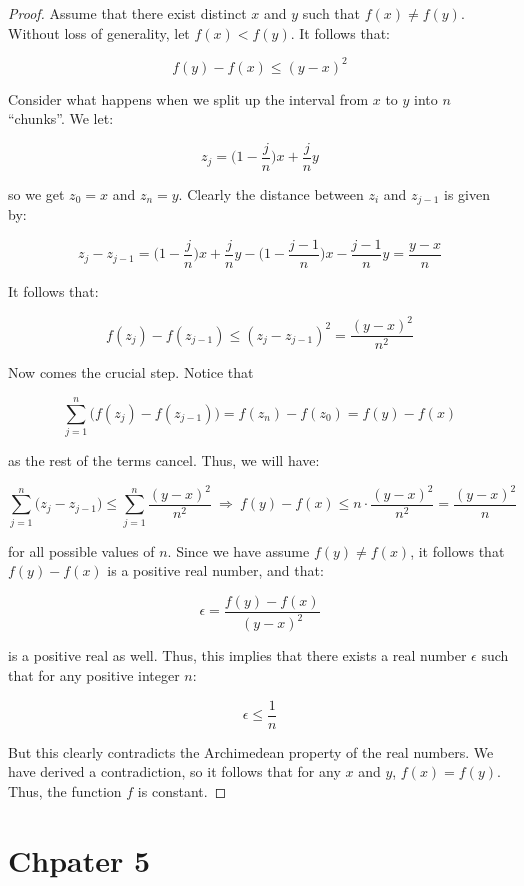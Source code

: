 \documentclass[10pt, oneside]{amsart}
\begin{document}
    \begin{proof}
      Assume that there exist distinct $x$ and $y$ such that $f(x) \neq f(y)$. Without loss of generality, let $f(x) < f(y)$. It follows that:

      $$f(y) - f(x) \leq (y - x)^2$$

      Consider what happens when we split up the interval from $x$ to $y$ into $n$ ``chunks''. We let:

      $$z_j = \Big(1 - \frac{j}{n} \Big) x + \frac{j}{n} y$$

      so we get $z_0 = x$ and $z_n = y$. Clearly the distance between $z_i$ and $z_{j - 1}$ is given by:

      $$z_{j} - z_{j - 1} = \Big(1 - \frac{j}{n} \Big) x + \frac{j}{n} y - \Big(1 - \frac{j - 1}{n} \Big) x - \frac{j - 1}{n} y = \frac{y - x}{n}$$

      It follows that:

      $$f(z_{j}) - f(z_{j - 1}) \leq (z_{j} - z_{j - 1})^2 =  \frac{(y - x)^2}{n^2}$$

      Now comes the crucial step. Notice that

      $$\displaystyle\sum_{j = 1}^{n} \big( f(z_{j}) - f(z_{j - 1}) \big) = f(z_{n}) - f(z_{0}) = f(y) - f(x)$$

      as the rest of the terms cancel. Thus, we will have:

      $$\displaystyle\sum_{j = 1}^{n} \big( z_{j} - z_{j - 1} \big) \leq \displaystyle\sum_{j = 1}^{n}
      \frac{(y - x)^2}{n^2} \ \Rightarrow \  f(y) - f(x) \leq n \cdot \frac{(y - x)^2}{n^2} = \frac{(y - x)^2}{n}$$

      for all possible values of $n$. Since we have assume $f(y) \neq f(x)$, it follows that $f(y) - f(x)$ is a positive real number, and that:

      $$\epsilon = \frac{f(y) - f(x)}{(y - x)^2}$$

      is a positive real as well. Thus, this implies that there exists a real number $\epsilon$ such that for any positive integer $n$:

      $$\epsilon \leq \frac{1}{n}$$

      But this clearly contradicts the Archimedean property of the real numbers. We have derived a contradiction, so it follows that for any $x$ and $y$, $f(x) = f(y)$. Thus,
      the function $f$ is constant.

    \end{proof}

    \section{Chpater 5}
\end{document}
